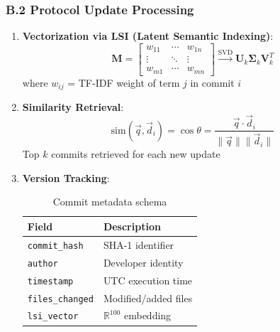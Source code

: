\documentclass[12pt]{article}
\begin{document}
\subsubsection*{B.2 Protocol Update Processing}
\begin{enumerate}
\item \textbf{Vectorization via LSI (Latent Semantic Indexing)}:
\begin{equation}
\mathbf{M} = \begin{bmatrix}
w_{11} & \cdots & w_{1n} \\
\vdots & \ddots & \vdots \\
w_{m1} & \cdots & w_{mn}
\end{bmatrix} \xrightarrow{\text{SVD}} \mathbf{U}_k \mathbf{\Sigma}_k \mathbf{V}_k^T
\end{equation}
where $w_{ij}$ = TF-IDF weight of term $j$ in commit $i$

\item \textbf{Similarity Retrieval}:
\begin{equation}
\text{sim}(\vec{q}, \vec{d}_i) = \cos\theta = \frac{\vec{q} \cdot \vec{d}_i}{\|\vec{q}\| \|\vec{d}_i\|}
\end{equation}
Top $k$ commits retrieved for each new update

\item \textbf{Version Tracking}:
\begin{table}[H]
\centering
\caption{Commit metadata schema}
\begin{tabular}{ll}
\toprule
\textbf{Field} & \textbf{Description} \\
\midrule
\texttt{commit\_hash} & SHA-1 identifier \\
\texttt{author} & Developer identity \\
\texttt{timestamp} & UTC execution time \\
\texttt{files\_changed} & Modified/added files \\
\texttt{lsi\_vector} & $\mathbb{R}^{100}$ embedding \\
\bottomrule
\end{tabular}
\end{table}
\end{enumerate}
\end{document}

